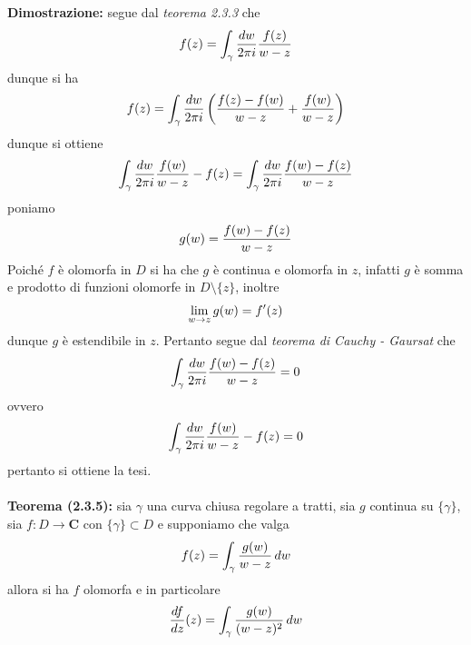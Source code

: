 \documentclass{article}
\begin{document}
\textbf{Dimostrazione:} segue dal \textit{teorema 2.3.3} che
\begin{gather}
    f(z) = \int_\gamma \frac{dw}{2\pi i}\frac{f(z)}{w - z} \notag
\end{gather}
dunque si ha
\begin{gather}
    f(z) = \int_\gamma \frac{dw}{2\pi i}\left(\frac{f(z) - f(w)}{w - z} + \frac{f(w)}{w - z}\right) \notag
\end{gather}
dunque si ottiene
\begin{gather}
    \int_\gamma\frac{dw}{2\pi i}\frac{f(w)}{w - z} - f(z) = \int_\gamma\frac{dw}{2\pi i}\frac{f(w) - f(z)}{w - z} \notag
\end{gather}
poniamo
\begin{gather}
    g(w) = \frac{f(w) - f(z)}{w - z} \notag
\end{gather}
Poiché $f$ è olomorfa in $D$ si ha che $g$ è continua e olomorfa in $z$, infatti $g$ è somma e prodotto di funzioni olomorfe in $D \setminus \{z\}$, inoltre
\begin{gather}
    \lim_{w \rightarrow z}g(w) = f'(z) \notag
\end{gather}
dunque $g$ è estendibile in $z$. Pertanto segue dal \textit{teorema di Cauchy - Gaursat} che
\begin{gather}
    \int_\gamma\frac{dw}{2\pi i}\frac{f(w) - f(z)}{w - z} = 0 \notag
\end{gather}
ovvero
\begin{gather}
    \int_\gamma\frac{dw}{2\pi i}\frac{f(w)}{w - z} - f(z) = 0 \notag
\end{gather}
pertanto si ottiene la tesi. \\ \\
\textbf{Teorema (2.3.5):} sia $\gamma$ una curva chiusa regolare a tratti, sia $g$ continua su $\{\gamma\}$, sia $f : D \longrightarrow \mathbf{C}$ con $\{\gamma\} \subset D$ e supponiamo che valga
\begin{gather}
    f(z) = \int_\gamma \frac{g(w)}{w - z} \, dw \notag
\end{gather}
allora si ha $f$ olomorfa e in particolare
\begin{gather}
    \frac{df}{dz}(z) = \int_\gamma\frac{g(w)}{(w - z)^2} \, dw \notag
\end{gather}
\end{document}
